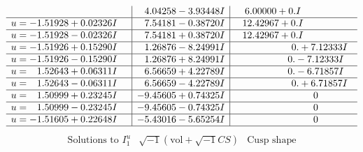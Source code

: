\documentclass[1p]{elsarticle_modified}
\theoremstyle{definition}
\newcommand{\I}{\sqrt{-1}}
\begin{document}
$$\begin{array}{c|c|c}
 & \phantom{-}4.04258 - 3.93448 I & \phantom{-}6.00000 + 0. I\phantom{ +0.000000I} \\ \hline\begin{aligned}
u &= -1.51928 + 0.02326 I\end{aligned}
 & \phantom{-}7.54181 - 0.38720 I & \phantom{-}12.42967 + 0. I\phantom{ +0.000000I} \\ \hline\begin{aligned}
u &= -1.51928 - 0.02326 I\end{aligned}
 & \phantom{-}7.54181 + 0.38720 I & \phantom{-}12.42967 + 0. I\phantom{ +0.000000I} \\ \hline\begin{aligned}
u &= -1.51926 + 0.15290 I\end{aligned}
 & \phantom{-}1.26876 - 8.24991 I & \phantom{-0.000000 -}0. + 7.12333 I \\ \hline\begin{aligned}
u &= -1.51926 - 0.15290 I\end{aligned}
 & \phantom{-}1.26876 + 8.24991 I & \phantom{-0.000000 } 0. - 7.12333 I \\ \hline\begin{aligned}
u &= \phantom{-}1.52643 + 0.06311 I\end{aligned}
 & \phantom{-}6.56659 + 4.22789 I & \phantom{-0.000000 } 0. - 6.71857 I \\ \hline\begin{aligned}
u &= \phantom{-}1.52643 - 0.06311 I\end{aligned}
 & \phantom{-}6.56659 - 4.22789 I & \phantom{-0.000000 -}0. + 6.71857 I \\ \hline\begin{aligned}
u &= \phantom{-}1.50999 + 0.23245 I\end{aligned}
 & -9.45605 + 0.74325 I & \phantom{-0.000000 } 0 \\ \hline\begin{aligned}
u &= \phantom{-}1.50999 - 0.23245 I\end{aligned}
 & -9.45605 - 0.74325 I & \phantom{-0.000000 } 0 \\ \hline\begin{aligned}
u &= -1.51605 + 0.22648 I\end{aligned}
 & -5.43016 - 5.65254 I & \phantom{-0.000000 } 0\\
 \hline 
 \end{array}$$\newpage$$\begin{array}{c|c|c}  
\text{Solutions to }I^u_{1}& \I (\text{vol} + \sqrt{-1}CS) & \text{Cusp shape}\\

\end{array}$$
\end{document}
